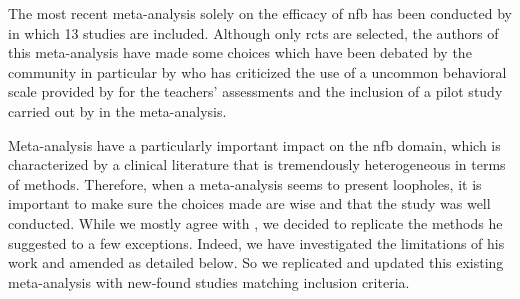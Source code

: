 The most recent meta-analysis solely on the efficacy of \gls{nfb} has been conducted by \citet{Cortese2016} in 
which 13 studies are included. Although only \gls{rcts}  are selected, the authors of 
this meta-analysis have made some choices which have been debated by the community in particular by 
\citet{Micoulaud2016} who has criticized the use of a uncommon behavioral scale provided by \citet{Steiner2014}
 for the teachers' assessments and the inclusion of a pilot study carried out by \citet{Arnold2014} in the meta-analysis. 

Meta-analysis have a particularly important impact on the \gls{nfb} domain, which is 
characterized by a clinical literature that is tremendously heterogeneous in terms 
of methods. Therefore, when a meta-analysis seems to present loopholes, it is important to
 make sure the choices made are wise and that the study was well conducted. 
While we mostly agree with \citet{Cortese2016}, we decided to replicate the methods he suggested
 to a few exceptions. Indeed, we have investigated the limitations
 of his work and amended as detailed below. So we replicated and updated this existing meta-analysis 
with new-found studies matching \citet{Cortese2016} inclusion criteria.  

